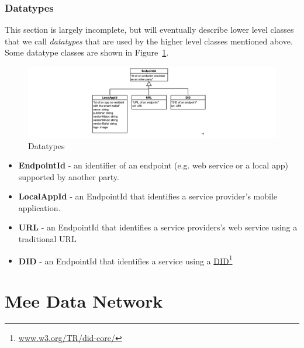 \documentclass[11pt, oneside]{article}   	%
\newcommand{\hyperfootnote}[1][]{\def\ArgI{{#1}}\hyperfootnoteRelay}
\newcommand\hyperfootnoteRelay[2][]{\href{#1#2}{\ArgI}\footnote{\href{#1#2}{#2}}}
\begin{document}
\subsubsection{Datatypes}

This section is largely incomplete, but will eventually describe lower level classes that we call \emph{datatypes} that are used by the higher level classes mentioned above. Some datatype classes are shown in Figure~\ref{fig:datatypes}.

\begin{figure}[htbp]
\includegraphics[width=\textwidth]{./images/datatypes.png}
\caption{Datatypes}
\label{fig:datatypes}
\end{figure}

\begin{itemize}
\item \textbf{EndpointId} -  an identifier of an endpoint (e.g. web service or a local app) supported by another party.
\item \textbf{LocalAppId} - an EndpointId that identifies a service provider's mobile application. 
\item \textbf{URL} - an EndpointId that identifies a service providers's web service using a traditional URL
\item \textbf{DID} - an EndpointId that identifies a service using a \hyperfootnote[DID][https://]{www.w3.org/TR/did-core/}
\end{itemize}

\section{Mee Data Network} %
\end{document}
